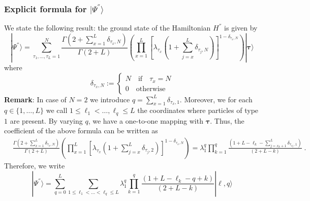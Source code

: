 \documentclass[10pt]{article}
\numberwithin{equation}{section}
\numberwithin{equation}{subsection}
\newcommand{\dt}{\;.}
\begin{document}
\subsubsection{Explicit formula for $|\Psi^{''}\rangle$}\label{subsectionSSHsec}
We state the following result: the ground state of the Hamiltonian $H^{''}$ is given by 
\begin{equation}\label{ResulsBasis}
	|\Psi^{''} \rangle=\sum_{\tau_{1},\ldots,\tau_{L}=1}^{N}\frac{\Gamma\left(2+\sum_{x=1}^{L}\delta_{\tau_{x},N}\right)}{\Gamma\left(2+L\right)}\left(\prod_{x=1}^{L}\left[\lambda_{\tau_{x}}\left(1+\sum_{j=x}^{L}\delta_{\tau_{j},N}\right)\right]^{1-\delta_{\tau_{x},N}}\right)|\mathbf{\bm{\tau}}\rangle
\end{equation}
where 
\begin{equation}
    \delta_{\tau_{x},N}:=\begin{cases}
        N\quad \text{if}\quad \tau_{x}=N\\
        0\quad \text{otherwise}
    \end{cases}
\end{equation}
\textbf{Remark}: In case of $N=2$ we introduce $q=\sum_{x=1}^{L}\delta_{\tau_{x},1}$. Moreover, we for each $q\in \{1,\ldots,L\}$ we call $1\leq\ell_{1}<\ldots,\ell_{q}\leq L$ the coordinates where particles of type $1$ are present. By varying $q$, we have a one-to-one mapping with $\bm{\tau}$. Thus, the coefficient of the above formula can be written as
\begin{align}
&\frac{\Gamma\left(2+\sum_{x=1}^{L}\delta_{\tau_{x},N}\right)}{\Gamma\left(2+L\right)}\left(\prod_{x=1}^{L}\left[\lambda_{\tau_{x}}\left(1+\sum_{j=x}^{L}\delta_{\tau_{j},2}\right)\right]^{1-\delta_{\tau_{x},N}}\right)%
=\lambda_{1}^{q}\prod_{k=1}^{q}\frac{\left(1+L-\ell_{k}-\sum_{j=x_{k}+1}^{L}\delta_{\tau_{x_{j}},1}\right)}{(2+L-k)}\dt
\end{align}
Therefore, we write 
\begin{equation}
	|\Psi^{''}\rangle=\sum_{q=0}^{L}\sum_{1\leq \ell_{1}<\ldots<\ell_{q}\leq L}\lambda_{1}^{q}\prod_{k=1}^{q}\frac{\left(1+L-\ell_{k}-q+k\right)}{(2+L-k)}|\bm{\ell},q\rangle
\end{equation}
\end{document}
